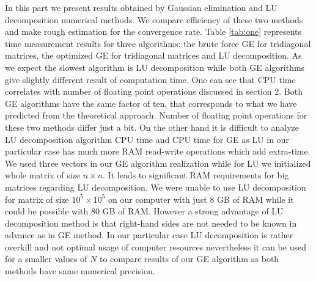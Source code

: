 \documentclass[10pt]{article}
\begin{document}
In this part we present results obtained by Gaussian elimination and LU decomposition numerical methods. We compare efficiency of these two methods and make rough estimation for the convergence rate.
Table \ref{tab:one} represents time measurement results for three algorithms: the brute force GE for tridiagonal matrices, the optimized GE for tridiagonal matrices and LU decomposition. As we expect the slowest algorithm is LU decomposition while both GE algorithms give slightly different result of computation time. One can see that CPU time correlates with number of floating point operations discussed in section 2.
Both GE algorithms have the same factor of ten, that corresponds to what we have predicted from the theoretical approach. Number of floating point operations for these two methods differ just a bit. On the other hand it is difficult to analyze LU decomposition algorithm CPU time and CPU time for GE as LU in our particular case has much more RAM read-write operations which add extra-time. We used three vectors in our GE algorithm realization while for LU we initialized whole matrix of size $n \times n$. It leads to significant RAM requirements for big matrices regarding LU decomposition. We were unable to use LU decomposition for matrix of size $10^5 \times 10^5$ on our computer with just 8 GB of RAM while it could be possible with 80 GB of RAM. However a strong advantage of LU decomposition method is that right-hand sides are not needed to be known in advance as in GE method.
In our particular case LU decomposition is rather overkill and not optimal usage of computer resources nevertheless it can be used for a smaller values of $N$ to compare results of our GE algorithm as both methods have same numerical precision.
\end{document}
